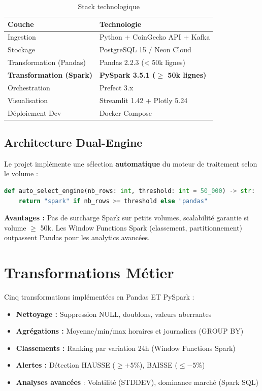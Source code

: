\documentclass[11pt,a4paper]{article}
\begin{document}
\begin{table}[H]
\centering
\small
\begin{tabular}{|l|p{6.5cm}|}
\hline
\textbf{Couche} & \textbf{Technologie} \\
\hline
Ingestion & Python + CoinGecko API + Kafka \\
\hline
Stockage & PostgreSQL 15 / Neon Cloud \\
\hline
Transformation (Pandas) & Pandas 2.2.3 (< 50k lignes) \\
\hline
\textbf{Transformation (Spark)} & \textbf{PySpark 3.5.1 ($\geq$ 50k lignes)} \\
\hline
Orchestration & Prefect 3.x \\
\hline
Visualisation & Streamlit 1.42 + Plotly 5.24 \\
\hline
Déploiement Dev & Docker Compose \\
\hline
\end{tabular}
\caption{Stack technologique}
\end{table}

\subsection{Architecture Dual-Engine}

Le projet implémente une sélection \textbf{automatique} du moteur de traitement selon le volume :

\begin{lstlisting}[language=Python]
def auto_select_engine(nb_rows: int, threshold: int = 50_000) -> str:
    return "spark" if nb_rows >= threshold else "pandas"
\end{lstlisting}

\textbf{Avantages :} Pas de surcharge Spark sur petits volumes, scalabilité garantie si volume $\geq$ 50k. Les Window Functions Spark (classement, partitionnement) outpassent Pandas pour les analytics avancées.

\section{Transformations Métier}

Cinq transformations implémentées en Pandas ET PySpark :

\begin{itemize}[noitemsep]
    \item \textbf{Nettoyage :} Suppression NULL, doublons, valeurs aberrantes
    \item \textbf{Agrégations :} Moyenne/min/max horaires et journaliers (GROUP BY)
    \item \textbf{Classements :} Ranking par variation 24h (Window Functions Spark)
    \item \textbf{Alertes :} Détection HAUSSE ($\geq +5\%$), BAISSE ($\leq -5\%$)
    \item \textbf{Analyses avancées} : Volatilité (STDDEV), dominance marché (Spark SQL)
\end{itemize}
\end{document}
